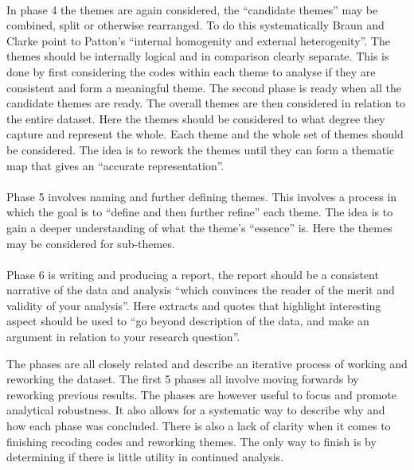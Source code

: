 \documentclass[11pt,UKenglish, a4paper]{article}
\begin{document}
\paragraph{}In phase 4 the themes are again considered, the ``candidate themes''\cite[p.91]{Braun2006Using} may be combined, split or otherwise rearranged. To do this systematically Braun and Clarke point to Patton's ``internal homogenity and external heterogenity''\cite[p.91]{Braun2006Using}. The themes should be internally logical and in comparison clearly separate. This is done by first considering the codes within each theme to analyse if they are consistent and form a meaningful theme. The second phase is ready when all the candidate themes are ready. The overall themes are then considered in relation to the entire dataset. Here the themes should be considered to what degree they capture and represent the whole. Each theme and the whole set of themes should be considered. The idea is to rework the themes until they can form a thematic map that gives an ``accurate representation''\cite[p.91]{Braun2006Using}. 

\paragraph{}Phase 5 involves naming and further defining themes. This involves a process in which the goal is to ``define and then further refine''\cite[p.92]{Braun2006Using} each theme. The idea is to gain a deeper understanding of what the theme's ``essence''\cite[p.92]{Braun2006Using} is. Here the themes may be considered for sub-themes. 

\paragraph{}Phase 6 is writing and producing a report, the report should be a consistent narrative of the data and analysis ``which convinces the reader of the merit and validity of your analysis''\cite[p.93]{Braun2006Using}. Here extracts and quotes that highlight interesting aspect should be used to ``go beyond description of the data, and make an argument in relation to your research question''\cite[p.93]{Braun2006Using}.

The phases are all closely related and describe an iterative process of working and reworking the dataset. The first 5 phases all involve moving forwards by reworking previous results. The phases are however useful to focus and promote analytical robustness. It also allows for a systematic way to describe why and how each phase was concluded. There is also a lack of clarity when it comes to finishing recoding codes and reworking themes. The only way to finish is by determining if there is little utility in continued analysis\cite[p.92]{Braun2006Using}.
\end{document}

